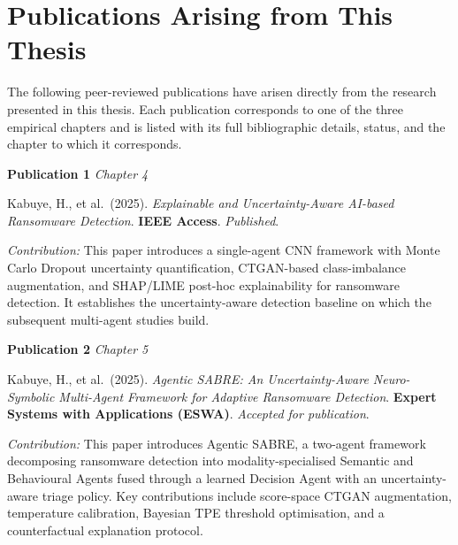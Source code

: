 
\chapter{Publications Arising from This Thesis}
\label{app:publications}

The following peer-reviewed publications have arisen directly from the research
presented in this thesis.
Each publication corresponds to one of the three empirical chapters and is listed
with its full bibliographic details, status, and the chapter to which it corresponds.

\vspace{1em}

\noindent\textbf{Publication 1} \hfill \textit{Chapter 4}

\vspace{0.5em}
\noindent Kabuye, H., et al.\ (2025).
\textit{Explainable and Uncertainty-Aware AI-based Ransomware Detection}.
\textbf{IEEE Access}.
\textit{Published}.
\cite{kabuye2025explainable}

\vspace{0.5em}
\noindent\textit{Contribution:} This paper introduces a single-agent CNN framework with
Monte Carlo Dropout uncertainty quantification, CTGAN-based class-imbalance augmentation,
and SHAP/LIME post-hoc explainability for ransomware detection.
It establishes the uncertainty-aware detection baseline on which the subsequent
multi-agent studies build.

\vspace{1.5em}

\noindent\textbf{Publication 2} \hfill \textit{Chapter 5}

\vspace{0.5em}
\noindent Kabuye, H., et al.\ (2025).
\textit{Agentic SABRE: An Uncertainty-Aware Neuro-Symbolic Multi-Agent Framework
for Adaptive Ransomware Detection}.
\textbf{Expert Systems with Applications (ESWA)}.
\textit{Accepted for publication}.
\cite{kabuye2026sabre}

\vspace{0.5em}
\noindent\textit{Contribution:} This paper introduces Agentic SABRE, a two-agent framework
decomposing ransomware detection into modality-specialised Semantic and Behavioural Agents
fused through a learned Decision Agent with an uncertainty-aware triage policy.
Key contributions include score-space CTGAN augmentation, temperature calibration,
Bayesian TPE threshold optimisation, and a counterfactual explanation protocol.

